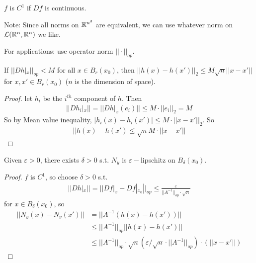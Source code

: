 \documentclass[a4paper]{article}
\begin{document}
$f$ is $C^1$ if $Df$ is continuous.

Note: Since all norms on $\mathbb{R}^{n^2}$ are equivalent, we can use whatever norm on $\mathcal{L}(\mathbb{R}^n,\mathbb{R}^n)$ we like.

For applications: use operator norm $||\cdot||_{op}$.

\begin{lemma}
If $||Dh|_x||_{op} < M$ for all $x \in B_r (x_0)$, then $||h(x)-h(x')||_2 \leq M\sqrt{n}||x-x'||$ for $x,x' \in B_r(x_0)$ ($n$ is the dimension of space).
\begin{proof}
let $h_i$ be the $i^{th}$ component of $h$. Then
\begin{equation*}
\begin{aligned}
||Dh_i|_x|| = ||Dh|_x(e_i)|| \leq M\cdot||e_i||_2=M
\end{aligned}
\end{equation*}
So by Mean value inequality, $|h_i(x)-h_i(x')| \leq M\cdot ||x-x'||_2$. So
\begin{equation*}
\begin{aligned}
||h(x)-h(x')\leq \sqrt{n} M\cdot ||x-x'||
\end{aligned}
\end{equation*}
\end{proof}
\end{lemma}

\begin{prop}
Given $\varepsilon>0$, there exists $\delta>0$ s.t. $N_y$ is $\varepsilon-$lipschitz on $B_\delta(x_0)$.
\begin{proof}
$f$ is $C^1$, so choose $\delta>0$ s.t.
\begin{equation*}
\begin{aligned}
||Dh|_x||=||Df|_x-Df|_{x_0}||_{op} \leq \frac{\varepsilon}{||A^{-1}||_{op}\cdot \sqrt{n}}
\end{aligned}
\end{equation*}
for $x \in B_\delta (x_0)$, so
\begin{equation*}
\begin{aligned}
||N_y(x)-N_y(x')|| &= ||A^{-1}(h(x)-h(x'))||\\
&\leq ||A^{-1}||_{op} ||h(x)-h(x')||\\
&\leq ||A^{-1}||_{op} \cdot \sqrt{n}(\varepsilon/\sqrt{n}\cdot ||A^{-1}||_{op})\cdot (||x-x'||)
\end{aligned}
\end{equation*}
\end{proof}
\end{prop}
\end{document}
